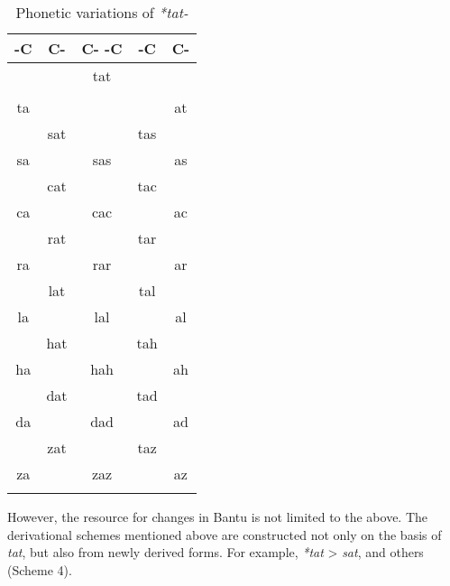 \begin{table}
\caption{\label{tab:4:7}Phonetic variations of \textit{*tat-}} 


\begin{tabularx}{.4\textwidth}{ccCcc}
\lsptoprule

-C & C- & C- -C & -C & C-\\
\midrule
&  & tat &  & \\
&  &  &  & \\
ta &  &  &  & at\\
& sat &  & tas & \\
sa &  & sas &  & as\\
& cat &  & tac & \\
ca &  & cac &  & ac\\
& rat &  & tar & \\
ra &  & rar &  & ar\\
& lat &  & tal & \\
la &  & lal &  & al\\
& hat &  & tah & \\
ha &  & hah &  & ah\\
& dat &  & tad & \\
da &  & dad &  & ad\\
& zat &  & taz & \\
za &  & zaz &  & az\\
\lspbottomrule
\end{tabularx}
\end{table}

However, the resource for changes in Bantu is not limited to the above. The derivational schemes mentioned above are constructed not only on the basis of \textit{tat}, but also from newly derived forms. For example, \textit{*tat} > \textit{sat}, and others (Scheme 4).

